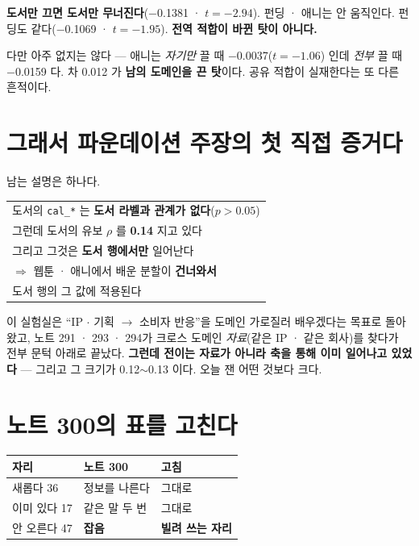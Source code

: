 \documentclass[10pt]{article}
\begin{document}
\textbf{도서만 끄면 도서만 무너진다}($-$0.1381 · $t{=}{-}2.94$). 펀딩 · 애니는
안 움직인다. 펀딩도 같다($-$0.1069 · $t{=}{-}1.95$). \textbf{전역 적합이 바뀐
탓이 아니다.}

다만 아주 없지는 않다 --- 애니는 \emph{자기만} 끌 때 $-$0.0037($t{=}{-}1.06$)
인데 \emph{전부} 끌 때 $-$0.0159 다. 차 0.012 가 \textbf{남의 도메인을 끈
탓}이다. 공유 적합이 실재한다는 또 다른 흔적이다.

\section{그래서 파운데이션 주장의 첫 직접 증거다}

남는 설명은 하나다.

\begin{center}\small
\begin{tabular}{l}
\hline
도서의 \texttt{cal\_*} 는 \textbf{도서 라벨과 관계가 없다}($p{>}0.05$) \\
그런데 도서의 유보 $\rho$ 를 \textbf{0.14} 지고 있다 \\
그리고 그것은 \textbf{도서 행에서만} 일어난다 \\
\hline
$\Rightarrow$ 웹툰 · 애니에서 배운 분할이 \textbf{건너와서} \\
\quad 도서 행의 그 값에 적용된다 \\
\hline
\end{tabular}
\end{center}

이 실험실은 ``IP $\cdot$ 기획 $\to$ 소비자 반응''을 도메인 가로질러 배우겠다는
목표로 돌아 왔고, 노트 291 · 293 · 294가 크로스 도메인 \emph{자료}(같은 IP ·
같은 회사)를 찾다가 전부 문턱 아래로 끝났다. \textbf{그런데 전이는 자료가
아니라 축을 통해 이미 일어나고 있었다} --- 그리고 그 크기가 0.12$\sim$0.13
이다. 오늘 잰 어떤 것보다 크다.

\section{노트 300의 표를 고친다}

\begin{center}\footnotesize
\begin{tabular}{lll}
\hline
자리 & 노트 300 & \textbf{고침} \\
\hline
새롭다 36 & 정보를 나른다 & 그대로 \\
이미 있다 17 & 같은 말 두 번 & 그대로 \\
안 오른다 47 & \textbf{잡음} & \textbf{빌려 쓰는 자리} \\
\hline
\end{tabular}
\end{center}
\end{document}
